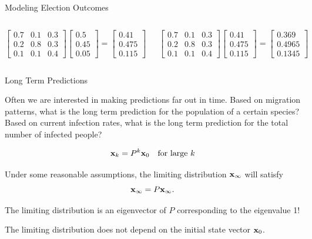 \documentclass[xcolor=dvipsnames,aspectratio=169,t]{beamer}
\begin{document}
\begin{frame}{Modeling Election Outcomes}
\begin{columns}[T]
  \[  \begin{bmatrix}
  0.7 & 0.1 & 0.3 \\
  0.2 & 0.8 & 0.3 \\
  0.1 & 0.1 & 0.4 \end{bmatrix} \begin{bmatrix} 0.5 \\ 0.45 \\ 0.05 \end{bmatrix}  = 
  \begin{bmatrix} 0.41 \\ 0.475 \\ 0.115 \end{bmatrix} \]

  \[  \begin{bmatrix}
  0.7 & 0.1 & 0.3 \\
  0.2 & 0.8 & 0.3 \\
  0.1 & 0.1 & 0.4 \end{bmatrix} \begin{bmatrix} 0.41 \\ 0.475 \\ 0.115 \end{bmatrix} = 
  \begin{bmatrix} 0.369 \\ 0.4965 \\ 0.1345 \end{bmatrix} \]

  \end{columns}
\end{frame}


\begin{frame}{Long Term Predictions}
  \smallskip

  Often we are interested in making predictions far out in time.
  \bi
  \ii Based on migration patterns, what is the long term prediction for the population of a certain species?
  \ii Based on current infection rates, what is the long term prediction for the total number of infected people?
  \ei

  \[ \mathbf{x}_k = P^k \mathbf{x}_0 \quad \mbox{for large } k \]
  \vspace*{-.2em}

  \pause
  Under some reasonable assumptions,
  the limiting distribution $\mathbf{x}_\infty$ will satisfy
  \[ \mathbf{x}_\infty = P \mathbf{x}_\infty. \]

  \pause
  The limiting distribution is an \alert{eigenvector} of $P$ corresponding to the \alert{eigenvalue 1!}
  \medskip

  \pause
  The limiting distribution does \alert{not} depend on the initial state vector $\mathbf{x}_0$.
\end{frame}
\end{document}
